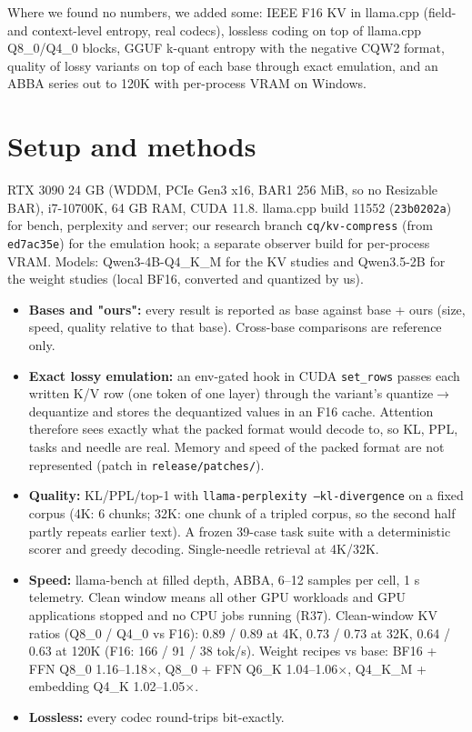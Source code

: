 \documentclass[10pt]{article}
\begin{document}
Where we found no numbers, we added some: IEEE F16 KV in llama.cpp (field- and context-level entropy, real
codecs), lossless coding on top of llama.cpp Q8\_0/Q4\_0 blocks, GGUF k-quant entropy with the negative CQW2
format, quality of lossy variants on top of each base through exact emulation, and an ABBA series out to 120K
with per-process VRAM on Windows.

\section{Setup and methods}

RTX 3090 24 GB (WDDM, PCIe Gen3 x16, BAR1 256 MiB, so no Resizable BAR), i7-10700K, 64 GB RAM, CUDA 11.8.
llama.cpp build 11552 (\texttt{23b0202a}) for bench, perplexity and server; our research branch \texttt{cq/kv-compress}
(from \texttt{ed7ac35e}) for the emulation hook; a separate observer build for per-process VRAM. Models:
Qwen3-4B-Q4\_K\_M for the KV studies and Qwen3.5-2B for the weight studies (local BF16, converted and quantized
by us).

\begin{itemize}
\item \textbf{Bases and "ours":} every result is reported as base against base + ours (size, speed, quality relative to that base). Cross-base comparisons are reference only.
\item \textbf{Exact lossy emulation:} an env-gated hook in CUDA \texttt{set\_rows} passes each written K/V row (one token of one layer) through the variant's quantize$\rightarrow$dequantize and stores the dequantized values in an F16 cache. Attention therefore sees exactly what the packed format would decode to, so KL, PPL, tasks and needle are real. Memory and speed of the packed format are not represented (patch in \texttt{release/patches/}).
\item \textbf{Quality:} KL/PPL/top-1 with \texttt{llama-perplexity --kl-divergence} on a fixed corpus (4K: 6 chunks; 32K: one chunk of a tripled corpus, so the second half partly repeats earlier text). A frozen 39-case task suite with a deterministic scorer and greedy decoding. Single-needle retrieval at 4K/32K.
\item \textbf{Speed:} llama-bench at filled depth, ABBA, 6--12 samples per cell, 1 s telemetry. Clean window means all other GPU workloads and GPU applications stopped and no CPU jobs running (R37). Clean-window KV ratios (Q8\_0 / Q4\_0 vs F16): 0.89 / 0.89 at 4K, 0.73 / 0.73 at 32K, 0.64 / 0.63 at 120K (F16: 166 / 91 / 38 tok/s). Weight recipes vs base: BF16 + FFN Q8\_0 1.16--1.18$\times$, Q8\_0 + FFN Q6\_K 1.04--1.06$\times$, Q4\_K\_M + embedding Q4\_K 1.02--1.05$\times$.
\item \textbf{Lossless:} every codec round-trips bit-exactly.
\end{itemize}
\end{document}
